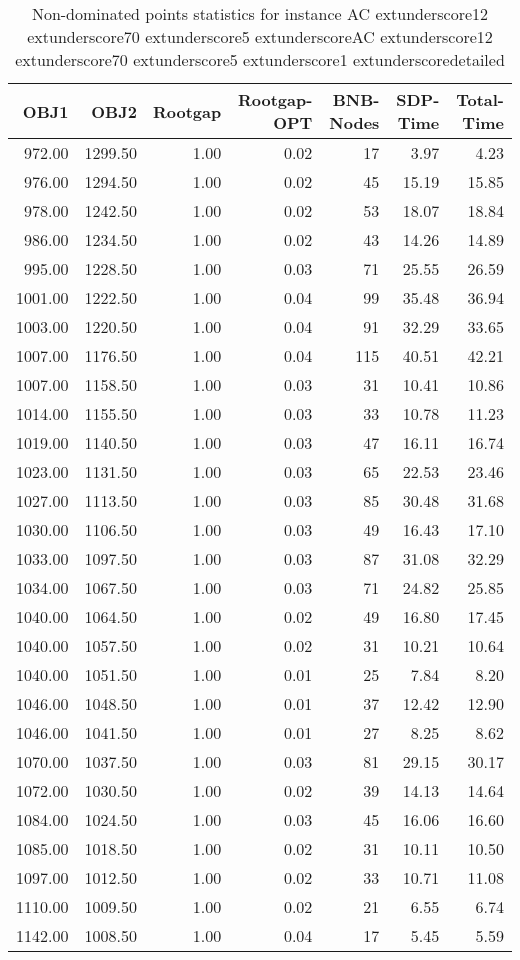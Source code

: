 \begin{table}
\caption{Non-dominated points statistics for instance AC	extunderscore12	extunderscore70	extunderscore5	extunderscoreAC	extunderscore12	extunderscore70	extunderscore5	extunderscore1	extunderscoredetailed}
\label{tab:stats/AC_12_70_5_AC_12_70_5_1_detailed}
\begin{tabular}{rrrrrrr}
\toprule
OBJ1 & OBJ2 & Rootgap & Rootgap-OPT & BNB-Nodes & SDP-Time & Total-Time \\
\midrule
972.00 & 1299.50 & 1.00 & 0.02 & 17 & 3.97 & 4.23 \\
976.00 & 1294.50 & 1.00 & 0.02 & 45 & 15.19 & 15.85 \\
978.00 & 1242.50 & 1.00 & 0.02 & 53 & 18.07 & 18.84 \\
986.00 & 1234.50 & 1.00 & 0.02 & 43 & 14.26 & 14.89 \\
995.00 & 1228.50 & 1.00 & 0.03 & 71 & 25.55 & 26.59 \\
1001.00 & 1222.50 & 1.00 & 0.04 & 99 & 35.48 & 36.94 \\
1003.00 & 1220.50 & 1.00 & 0.04 & 91 & 32.29 & 33.65 \\
1007.00 & 1176.50 & 1.00 & 0.04 & 115 & 40.51 & 42.21 \\
1007.00 & 1158.50 & 1.00 & 0.03 & 31 & 10.41 & 10.86 \\
1014.00 & 1155.50 & 1.00 & 0.03 & 33 & 10.78 & 11.23 \\
1019.00 & 1140.50 & 1.00 & 0.03 & 47 & 16.11 & 16.74 \\
1023.00 & 1131.50 & 1.00 & 0.03 & 65 & 22.53 & 23.46 \\
1027.00 & 1113.50 & 1.00 & 0.03 & 85 & 30.48 & 31.68 \\
1030.00 & 1106.50 & 1.00 & 0.03 & 49 & 16.43 & 17.10 \\
1033.00 & 1097.50 & 1.00 & 0.03 & 87 & 31.08 & 32.29 \\
1034.00 & 1067.50 & 1.00 & 0.03 & 71 & 24.82 & 25.85 \\
1040.00 & 1064.50 & 1.00 & 0.02 & 49 & 16.80 & 17.45 \\
1040.00 & 1057.50 & 1.00 & 0.02 & 31 & 10.21 & 10.64 \\
1040.00 & 1051.50 & 1.00 & 0.01 & 25 & 7.84 & 8.20 \\
1046.00 & 1048.50 & 1.00 & 0.01 & 37 & 12.42 & 12.90 \\
1046.00 & 1041.50 & 1.00 & 0.01 & 27 & 8.25 & 8.62 \\
1070.00 & 1037.50 & 1.00 & 0.03 & 81 & 29.15 & 30.17 \\
1072.00 & 1030.50 & 1.00 & 0.02 & 39 & 14.13 & 14.64 \\
1084.00 & 1024.50 & 1.00 & 0.03 & 45 & 16.06 & 16.60 \\
1085.00 & 1018.50 & 1.00 & 0.02 & 31 & 10.11 & 10.50 \\
1097.00 & 1012.50 & 1.00 & 0.02 & 33 & 10.71 & 11.08 \\
1110.00 & 1009.50 & 1.00 & 0.02 & 21 & 6.55 & 6.74 \\
1142.00 & 1008.50 & 1.00 & 0.04 & 17 & 5.45 & 5.59 \\
\bottomrule
\end{tabular}
\end{table}
